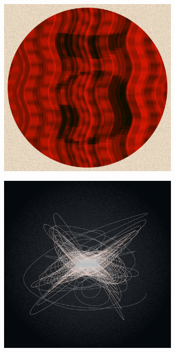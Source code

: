 \documentclass[11pt,twoside]{book}
\begin{document}
\begin{figure}[!ht]
\includegraphics[width=246pt]{constructivist-5-ad6ce6fd-3c58-4195-97ed-d5483c17e18b.png}
\end{figure}
\newpage
{}
\fancyfoot[CE,CO]{\fontsize{10}{12}\selectfont \thepage}
\begin{figure}[!ht]
\includegraphics[width=246pt]{candyfloss-9d317a02-51d5-47b4-ab20-df9b8154d844.png}
\end{figure}
\newpage
{}
\fancyfoot[CE,CO]{\fontsize{10}{12}\selectfont \thepage}
\end{document}
